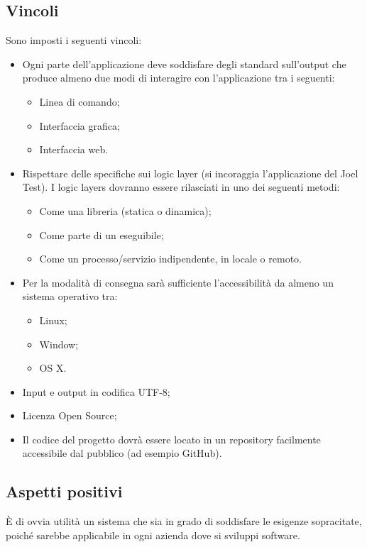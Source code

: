 \subsection{Vincoli}
Sono imposti i seguenti vincoli:
\begin{itemize}
\item Ogni parte dell'applicazione deve soddisfare degli standard sull'output che produce almeno due modi di interagire con l'applicazione tra i seguenti:
\begin{itemize}
\item Linea di comando;
\item Interfaccia grafica;
\item Interfaccia web.
\end{itemize}

\item Rispettare delle specifiche sui logic layer (si incoraggia l'applicazione del Joel Test). I logic layers dovranno essere rilasciati in uno dei seguenti metodi:
\begin{itemize}
\item Come una libreria (statica o dinamica);
\item Come parte di un eseguibile;
\item Come un processo/servizio indipendente, in locale o remoto.
\end{itemize}

\item Per la modalità di consegna sarà sufficiente l'accessibilità da almeno un sistema operativo tra:
\begin{itemize}
\item Linux;
\item Window;
\item OS X.
\end{itemize}

\item Input e output in codifica UTF-8;
\item Licenza Open Source;
\item Il codice del progetto dovrà essere locato in un repository facilmente accessibile dal pubblico (ad esempio GitHub).
\end{itemize}

\subsection{Aspetti positivi}
\`E di ovvia utilità un sistema che sia in grado di soddisfare le esigenze sopracitate, poiché sarebbe applicabile in ogni azienda dove si sviluppi software.

